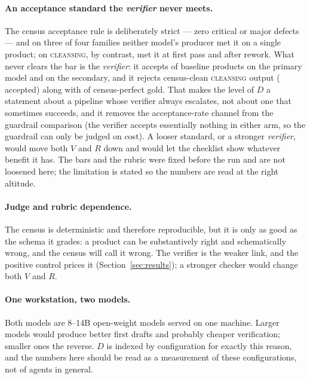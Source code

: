 \documentclass[11pt]{article}
\newcommand{\D}{\ensuremath{D}}
\newcommand{\VV}{\ensuremath{V}}
\newcommand{\RV}{\ensuremath{R}}
\newcommand{\famname}[1]{\textsc{#1}}
\begin{document}
\paragraph{An acceptance standard the \emph{verifier} never meets.} The census acceptance rule is
deliberately strict --- zero critical or major defects --- and on three of four families neither
model's producer met it on a single product; on \famname{cleansing}, by contrast, \VDCleansePass{}
met it at first pass and \VDCleanseFinal{} after rework. What never clears the bar is the
\emph{verifier}: it accepts \VDqBaseAcc{} of baseline products on the primary model and
\VDlBaseAcc{} on the secondary, and it rejects census-clean \famname{cleansing} output
(\VDCleanseVerAcc{} accepted) along with \VDgoldRej{} of census-perfect gold. That makes the level of
$\D$ a statement about a pipeline whose verifier always escalates, not about one that sometimes
succeeds, and it removes the acceptance-rate channel from the guardrail comparison (the verifier
accepts essentially nothing in either arm, so the guardrail can only be judged on cost). A looser
standard, or a stronger \emph{verifier}, would move both $\VV$ and $\RV$ down and would let the
checklist show whatever benefit it has. The bars and the rubric were fixed before the run and are
not loosened here; the limitation is stated so the numbers are read at the right altitude.

\paragraph{Judge and rubric dependence.} The census is deterministic and therefore reproducible,
but it is only as good as the schema it grades: a product can be substantively right and
schematically wrong, and the census will call it wrong. The verifier is the weaker link, and the
positive control prices it (Section~\ref{sec:results}); a stronger checker would change both
$\VV$ and $\RV$.

\paragraph{One workstation, two models.} Both models are 8--14B open-weight models served on one
machine. Larger models would produce better first drafts and probably cheaper verification;
smaller ones the reverse. $\D$ is indexed by configuration for exactly this reason, and the numbers
here should be read as a measurement of these configurations, not of agents in general.
\end{document}

